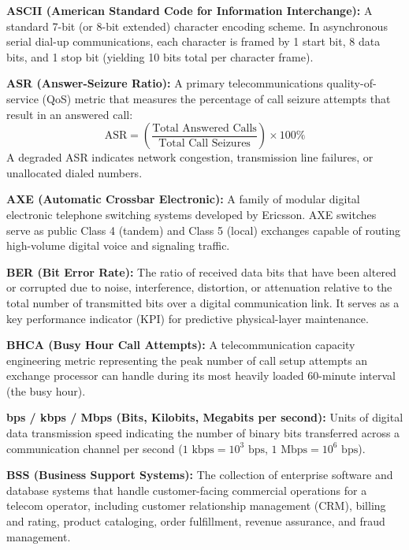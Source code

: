 \documentclass[12pt,a4paper]{report}
\begin{document}
\vspace{0.2cm}
\noindent\textbf{ASCII (American Standard Code for Information Interchange):} A standard 7-bit (or 8-bit extended) character encoding scheme. In asynchronous serial dial-up communications, each character is framed by 1 start bit, 8 data bits, and 1 stop bit (yielding 10 bits total per character frame).

\vspace{0.2cm}
\noindent\textbf{ASR (Answer-Seizure Ratio):} A primary telecommunications quality-of-service (QoS) metric that measures the percentage of call seizure attempts that result in an answered call:
\[ \text{ASR} = \left(\frac{\text{Total Answered Calls}}{\text{Total Call Seizures}}\right) \times 100\% \]
A degraded ASR indicates network congestion, transmission line failures, or unallocated dialed numbers.

\vspace{0.2cm}
\noindent\textbf{AXE (Automatic Crossbar Electronic):} A family of modular digital electronic telephone switching systems developed by Ericsson. AXE switches serve as public Class 4 (tandem) and Class 5 (local) exchanges capable of routing high-volume digital voice and signaling traffic.

\vspace{0.2cm}
\noindent\textbf{BER (Bit Error Rate):} The ratio of received data bits that have been altered or corrupted due to noise, interference, distortion, or attenuation relative to the total number of transmitted bits over a digital communication link. It serves as a key performance indicator (KPI) for predictive physical-layer maintenance.

\vspace{0.2cm}
\noindent\textbf{BHCA (Busy Hour Call Attempts):} A telecommunication capacity engineering metric representing the peak number of call setup attempts an exchange processor can handle during its most heavily loaded 60-minute interval (the busy hour).

\vspace{0.2cm}
\noindent\textbf{bps / kbps / Mbps (Bits, Kilobits, Megabits per second):} Units of digital data transmission speed indicating the number of binary bits transferred across a communication channel per second ($1\text{ kbps} = 10^3\text{ bps}$, $1\text{ Mbps} = 10^6\text{ bps}$).

\vspace{0.2cm}
\noindent\textbf{BSS (Business Support Systems):} The collection of enterprise software and database systems that handle customer-facing commercial operations for a telecom operator, including customer relationship management (CRM), billing and rating, product cataloging, order fulfillment, revenue assurance, and fraud management.
\end{document}
